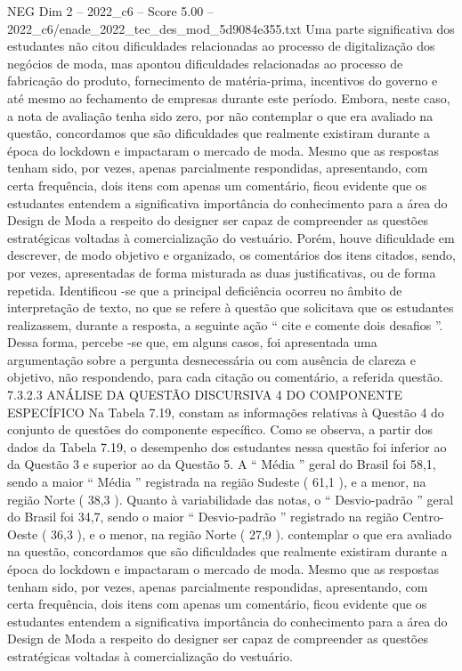 \begin{textsample}{NEG Dim 2 – 2022\_c6 – Score 5.00 – 2022\_c6/enade\_2022\_tec\_des\_mod\_5d9084e355.txt}
Uma parte significativa dos estudantes não citou dificuldades relacionadas ao processo de digitalização dos negócios de moda, mas apontou dificuldades relacionadas ao processo de fabricação do produto, fornecimento de matéria-prima, incentivos do governo e até mesmo ao fechamento de empresas durante este período.
Embora, neste caso, a nota de avaliação tenha sido zero, por não contemplar o que era avaliado na questão, concordamos que são dificuldades que realmente existiram durante a época do lockdown e impactaram o mercado de moda.
Mesmo que as respostas tenham sido, por vezes, apenas parcialmente respondidas, apresentando, com certa frequência, dois itens com apenas um comentário, ficou evidente que os estudantes entendem a significativa importância do conhecimento para a área do Design de Moda a respeito do designer ser capaz de compreender as questões estratégicas voltadas à comercialização do vestuário.
Porém, houve dificuldade em descrever, de modo objetivo e organizado, os comentários dos itens citados, sendo, por vezes, apresentadas de forma misturada as duas justificativas, ou de forma repetida.
Identificou -se que a principal deficiência ocorreu no âmbito de interpretação de texto, no que se refere à questão que solicitava que os estudantes realizassem, durante a resposta, a seguinte ação “ cite e comente dois desafios ”.
Dessa forma, percebe -se que, em alguns casos, foi apresentada uma argumentação sobre a pergunta desnecessária ou com ausência de clareza e objetivo, não respondendo, para cada citação ou comentário, a referida questão. 7.3.2.3 ANÁLISE DA QUESTÃO DISCURSIVA 4 DO COMPONENTE ESPECÍFICO Na Tabela 7.19, constam as informações relativas à Questão 4 do conjunto de questões do componente específico.
Como se observa, a partir dos dados da Tabela 7.19, o desempenho dos estudantes nessa questão foi inferior ao da Questão 3 e superior ao da Questão 5.
A “ Média ” geral do Brasil foi 58,1, sendo a maior “ Média ” registrada na região Sudeste ( 61,1 ), e a menor, na região Norte ( 38,3 ).
Quanto à variabilidade das notas, o “ Desvio-padrão ” geral do Brasil foi 34,7, sendo o maior “ Desvio-padrão ” registrado na região Centro-Oeste ( 36,3 ), e o menor, na região Norte ( 27,9 ). contemplar o que era avaliado na questão, concordamos que são dificuldades que realmente existiram durante a época do lockdown e impactaram o mercado de moda.
Mesmo que as respostas tenham sido, por vezes, apenas parcialmente respondidas, apresentando, com certa frequência, dois itens com apenas um comentário, ficou evidente que os estudantes entendem a significativa importância do conhecimento para a área do Design de Moda a respeito do designer ser capaz de compreender as questões estratégicas voltadas à comercialização do vestuário.

\end{textsample}
